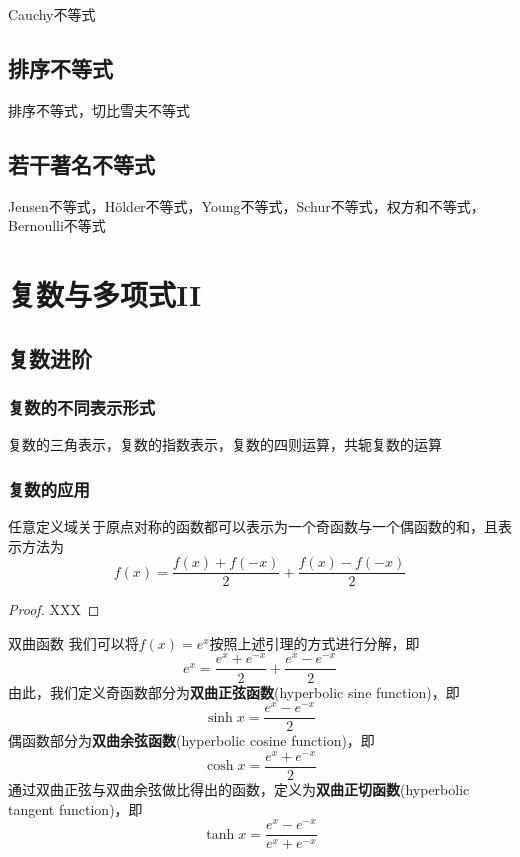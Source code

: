\documentclass[lang=cn, zihao=5]{elegantbook}
\begin{document}
Cauchy不等式

\section{排序不等式}

排序不等式，切比雪夫不等式

\section{若干著名不等式}

Jensen不等式，Hölder不等式，Young不等式，Schur不等式，权方和不等式，Bernoulli不等式

\chapter{复数与多项式II}

\section{复数进阶}

\subsection{复数的不同表示形式}

复数的三角表示，复数的指数表示，复数的四则运算，共轭复数的运算

\subsection{复数的应用}

\begin{lemma}
    任意定义域关于原点对称的函数都可以表示为一个奇函数与一个偶函数的和，且表示方法为$$f(x)=\frac{f(x)+f(-x)}{2}+\frac{f(x)-f(-x)}{2}$$
\end{lemma}
\begin{proof}
    XXX
\end{proof}

\begin{definition}{双曲函数}
    我们可以将$f(x)=e^x$按照上述引理的方式进行分解，即$$e^x=\frac{e^x+e^{-x}}{2}+\frac{e^x-e^{-x}}{2}$$
    由此，我们定义奇函数部分为\textbf{双曲正弦函数}(hyperbolic sine function)，即$$\sinh{x}=\frac{e^x-e^{-x}}{2}$$
    偶函数部分为\textbf{双曲余弦函数}(hyperbolic cosine function)，即$$\cosh{x}=\frac{e^x+e^{-x}}{2}$$
    通过双曲正弦与双曲余弦做比得出的函数，定义为\textbf{双曲正切函数}(hyperbolic tangent function)，即$$\tanh{x}=\frac{e^x-e^{-x}}{e^x+e^{-x}}$$
\end{definition}
\end{document}
